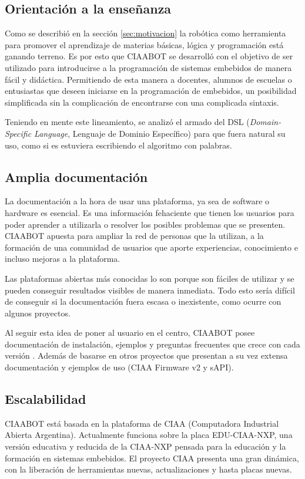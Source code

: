 \subsection{Orientación a la enseñanza}
\label{subsec:orientacion}
Como se describió en la sección \ref{sec:motivacion} la robótica como herramienta para promover el aprendizaje de materias básicas, lógica y programación está ganando terreno. Es por esto que CIAABOT se desarrolló con el objetivo de ser utilizado para introducirse a la programación de sistemas embebidos de manera fácil y didáctica. Permitiendo de esta manera a docentes, alumnos de escuelas o entusiastas que deseen iniciarse en la programación de embebidos, un posibilidad simplificada sin la complicación de encontrarse con una complicada sintaxis.

Teniendo en mente este lineamiento, se analizó el armado del DSL (\emph{Domain-Specific Language}, Lenguaje de Dominio Específico) para que fuera natural su uso, como si es estuviera escribiendo el algoritmo con palabras. 

\subsection{Amplia documentación}
\label{subsec:ampliaDoc}
La documentación a la hora de usar una plataforma, ya sea de software o hardware es esencial. Es una información fehaciente que tienen los usuarios para poder aprender a utilizarla o resolver los posibles problemas que se presenten. CIAABOT apuesta para ampliar la red de personas que la utilizan, a la formación de una comunidad de usuarios que aporte experiencias, conocimiento e incluso mejoras a la plataforma.

Las plataformas abiertas más conocidas lo son porque son fáciles de utilizar y se pueden conseguir resultados visibles de manera inmediata. Todo esto sería difícil de conseguir si la documentación fuera escasa o inexistente, como ocurre con algunos proyectos.

Al seguir esta idea de poner al usuario en el centro, CIAABOT posee documentación de instalación, ejemplos y preguntas frecuentes que crece con cada versión \citep{CIAABOT:documentacion}. Además de basarse en otros proyectos que presentan a su vez extensa documentación y ejemplos de uso (CIAA Firmware v2 y sAPI).

\subsection{Escalabilidad}
\label{subsec:escalabilidad}
CIAABOT está basada en la plataforma de CIAA \citep{CIAA}(Computadora Industrial Abierta Argentina). Actualmente funciona sobre la placa EDU-CIAA-NXP, una versión educativa y reducida de la CIAA-NXP pensada para la educación y la formación en sistemas embebidos. El proyecto CIAA presenta una gran dinámica, con la liberación de herramientas nuevas, actualizaciones y hasta placas nuevas. 

